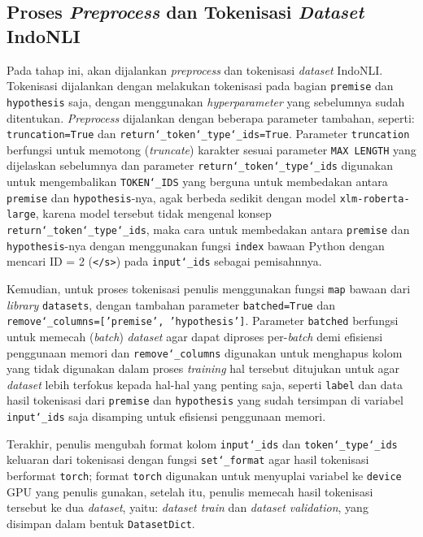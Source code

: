 \subsection{Proses \emph{Preprocess} dan Tokenisasi \emph{Dataset} IndoNLI}
Pada tahap ini, akan dijalankan  \emph{preprocess} dan tokenisasi \emph{dataset} IndoNLI. Tokenisasi dijalankan dengan melakukan tokenisasi pada bagian \texttt{premise} dan \texttt{hypothesis} saja, dengan menggunakan \emph{hyperparameter} yang sebelumnya sudah ditentukan. \emph{Preprocess} dijalankan dengan beberapa parameter tambahan, seperti: \texttt{truncation=True} dan \texttt{return\char`_token\char`_type\char`_ids=True}. Parameter \texttt{truncation} berfungsi untuk memotong (\emph{truncate}) karakter sesuai parameter \texttt{MAX LENGTH} yang dijelaskan sebelumnya dan parameter \texttt{return\char`_token\char`_type\char`_ids} digunakan untuk mengembalikan \texttt{TOKEN\char`_IDS} yang berguna untuk membedakan antara \texttt{premise} dan \texttt{hypothesis}-nya, agak berbeda sedikit dengan model \texttt{xlm-roberta-large}, karena model tersebut tidak mengenal konsep \texttt{return\char`_token\char`_type\char`_ids}, maka cara untuk membedakan antara \texttt{premise} dan \texttt{hypothesis}-nya dengan menggunakan fungsi \texttt{index} bawaan Python dengan mencari ID = 2 (\texttt{</s>}) pada \texttt{input\char`_ids} sebagai pemisahnnya. 

Kemudian, untuk proses tokenisasi penulis menggunakan fungsi \texttt{map} bawaan dari \emph{library} \texttt{datasets}, dengan tambahan parameter \texttt{batched=True} dan \texttt{remove\char`_columns=['premise', 'hypothesis']}. Parameter \texttt{batched} berfungsi untuk memecah (\emph{batch}) \emph{dataset} agar dapat diproses per-\emph{batch} demi efisiensi penggunaan memori dan \texttt{remove\char`_columns} digunakan untuk menghapus kolom yang tidak digunakan dalam proses \emph{training} hal tersebut ditujukan untuk agar \emph{dataset} lebih terfokus kepada hal-hal yang penting saja, seperti \texttt{label} dan data hasil tokenisasi dari \texttt{premise} dan   \texttt{hypothesis} yang sudah tersimpan di variabel \texttt{input\char`_ids} saja disamping untuk efisiensi penggunaan memori.

Terakhir, penulis mengubah format kolom \texttt{input\char`_ids} dan \texttt{token\char`_type\char`_ids} keluaran dari tokenisasi dengan fungsi \texttt{set\char`_format} agar hasil tokenisasi berformat \texttt{torch}; format \texttt{torch} digunakan untuk menyuplai variabel ke \texttt{device} GPU yang penulis gunakan, setelah itu, penulis memecah hasil tokenisasi tersebut ke dua \emph{dataset}, yaitu: \emph{dataset train} dan \emph{dataset validation}, yang disimpan dalam bentuk \texttt{DatasetDict}.


